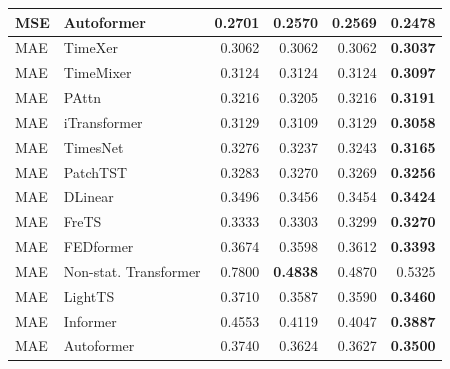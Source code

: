 \begin{longtable}{llrrrr}
MSE & Autoformer & 0.2701 & 0.2570 & 0.2569 & \textbf{0.2478} \\
\midrule
MAE & TimeXer & 0.3062 & 0.3062 & 0.3062 & \textbf{0.3037} \\
MAE & TimeMixer & 0.3124 & 0.3124 & 0.3124 & \textbf{0.3097} \\
MAE & PAttn & 0.3216 & 0.3205 & 0.3216 & \textbf{0.3191} \\
MAE & iTransformer & 0.3129 & 0.3109 & 0.3129 & \textbf{0.3058} \\
MAE & TimesNet & 0.3276 & 0.3237 & 0.3243 & \textbf{0.3165} \\
MAE & PatchTST & 0.3283 & 0.3270 & 0.3269 & \textbf{0.3256} \\
MAE & DLinear & 0.3496 & 0.3456 & 0.3454 & \textbf{0.3424} \\
MAE & FreTS & 0.3333 & 0.3303 & 0.3299 & \textbf{0.3270} \\
MAE & FEDformer & 0.3674 & 0.3598 & 0.3612 & \textbf{0.3393} \\
MAE & Non-stat. Transformer & 0.7800 & \textbf{0.4838} & 0.4870 & 0.5325 \\
MAE & LightTS & 0.3710 & 0.3587 & 0.3590 & \textbf{0.3460} \\
MAE & Informer & 0.4553 & 0.4119 & 0.4047 & \textbf{0.3887} \\
MAE & Autoformer & 0.3740 & 0.3624 & 0.3627 & \textbf{0.3500} \\
\end{longtable}
\endgroup

